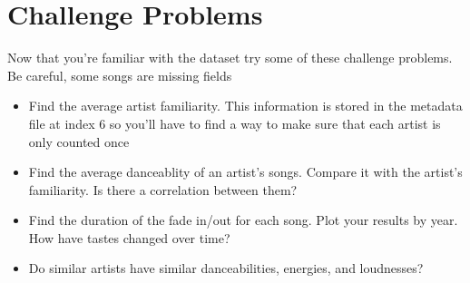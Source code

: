 \documentclass[letterpaper,10pt,openany,oneside]{sphinxmanual}
\begin{document}
\chapter{Challenge Problems}
\label{2-Challenges/Challenges:challenge-problems}\label{2-Challenges/Challenges::doc}
Now that you're familiar with the dataset try some of these
challenge problems. Be careful, some songs are missing fields
\begin{itemize}
\item {} 
Find the average artist familiarity. This information is stored
in the metadata file at index 6 so you'll have to find a way
to make sure that each artist is only counted once

\item {} 
Find the average danceablity of an artist's songs. Compare it
with the artist's familiarity. Is there a correlation between
them?

\item {} 
Find the duration of the fade in/out for each song. Plot your
results by year. How have tastes changed over time?

\item {} 
Do similar artists have similar danceabilities, energies, and
loudnesses?

\end{itemize}



\renewcommand{\indexname}{Index}
\printindex
\end{document}
